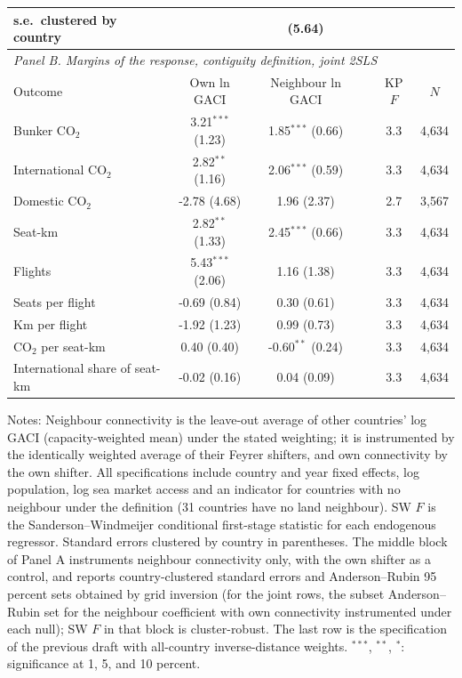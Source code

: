 \begin{table}[htbp]
\begin{threeparttable}
\begin{tabular}{lccccc}
  \quad s.e.\ clustered by country & & (5.64) & & & \\
\midrule
\multicolumn{6}{l}{\textit{Panel B. Margins of the response, contiguity definition, joint 2SLS}} \\
Outcome & Own ln GACI & Neighbour ln GACI & & KP $F$ & $N$ \\
\midrule
  Bunker CO$_2$ & 3.21$^{***}$ (1.23) & 1.85$^{***}$ (0.66) & & 3.3 & 4,634 \\
  International CO$_2$ & 2.82$^{**}$ (1.16) & 2.06$^{***}$ (0.59) & & 3.3 & 4,634 \\
  Domestic CO$_2$ & -2.78 (4.68) & 1.96 (2.37) & & 2.7 & 3,567 \\
  Seat-km & 2.82$^{**}$ (1.33) & 2.45$^{***}$ (0.66) & & 3.3 & 4,634 \\
  Flights & 5.43$^{***}$ (2.06) & 1.16 (1.38) & & 3.3 & 4,634 \\
  Seats per flight & -0.69 (0.84) & 0.30 (0.61) & & 3.3 & 4,634 \\
  Km per flight & -1.92 (1.23) & 0.99 (0.73) & & 3.3 & 4,634 \\
  CO$_2$ per seat-km & 0.40 (0.40) & -0.60$^{**}$ (0.24) & & 3.3 & 4,634 \\
  International share of seat-km & -0.02 (0.16) & 0.04 (0.09) & & 3.3 & 4,634 \\
\bottomrule
\end{tabular}
\begin{tablenotes}[flushleft]
\footnotesize
\item Notes: Neighbour connectivity is the leave-out average of other countries' log GACI (capacity-weighted mean) under the stated weighting; it is instrumented by the identically weighted average of their Feyrer shifters, and own connectivity by the own shifter. All specifications include country and year fixed effects, log population, log sea market access and an indicator for countries with no neighbour under the definition (31 countries have no land neighbour). SW $F$ is the Sanderson--Windmeijer conditional first-stage statistic for each endogenous regressor. Standard errors clustered by country in parentheses. The middle block of Panel A instruments neighbour connectivity only, with the own shifter as a control, and reports country-clustered standard errors and Anderson--Rubin 95 percent sets obtained by grid inversion (for the joint rows, the subset Anderson--Rubin set for the neighbour coefficient with own connectivity instrumented under each null); SW $F$ in that block is cluster-robust. The last row is the specification of the previous draft with all-country inverse-distance weights. $^{***}$, $^{**}$, $^{*}$: significance at 1, 5, and 10 percent.
\end{tablenotes}
\end{threeparttable}
\end{table}

